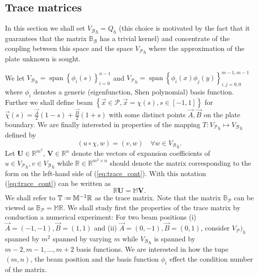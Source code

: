 \documentclass[a4paper,10pt]{article}
\newcommand{\R}{\ensuremath{\mathbb{R}}}
\newcommand{\inner}[2]{\ensuremath{\left(#1, #2\right)}}
\newcommand{\Vp}{\ensuremath{V_{\mathcal{P}}}}
\newcommand{\Vb}{\ensuremath{V_{\mathcal{B}}}}
\newcommand{\Bp}{\ensuremath{\mathbb{B}_{\mathcal{P}}}}
\newcommand{\Bb}{\ensuremath{\mathbb{B}_{\mathcal{B}}}}
\newcommand{\Mmat}{\ensuremath{\mathbb{M}}}
\newcommand*{\defeq}{\mathrel{\vcenter{\baselineskip0.5ex \lineskiplimit0pt
                     \hbox{\scriptsize.}\hbox{\scriptsize.}}}%
                     =}
\DeclareMathOperator{\spn}{span}
\begin{document}
\subsection{Trace matrices}
In this section we shall set ${\Vb}_h=Q_h$ (this choice is motivated by the 
fact that it guarantees that the matrix $\Bb$ has a trivial kernel) and 
concentrate of the coupling between this space and the space ${\Vp}_h$ where
the approximation of the plate unknown is sought.

We let ${\Vb}_h=\spn\left\{\phi_i(s)\right\}_{i=0}^{n-1}$ and
${\Vp}_h=\spn\left\{\phi_i(x) \phi_j(y)\right\}_{i, j=0, 0}^{m-1, m-1}$ where
$\phi_i$ denotes a generic (eigenfunction, Shen polynomial) basis function.
Further we shall define beam 
$\left\{\vec{x}\in\mathcal{P}, \vec{x}=\chi(s), s\in\left[-1, 1\right]\right\}$
for $\vec{\chi}(s)=\frac{\vec{A}}{2}(1-s) +\frac{\vec{B}}{2}(1+s)$ with some
distinct points $\vec{A}, \vec{B}$ on the plate boundary. We are finally
interested in properties of the mapping $T:{\Vp}_h\mapsto{\Vb}_h$ defined
by
\begin{equation}
  \label{eq:trace_cont}
\inner{u\circ\chi}{w} = \inner{v}{w}\quad\forall w\in{\Vb}_h.
\end{equation}
Let $\mathbf{U}\in\R^{m^2}$, $\mathbf{V}\in\R^{n}$ denote the vectors of expansion
coefficients of $u\in{\Vp}_h, v\in{\Vb}_h$ while $\mathbb{R}\in\R^{m^2\times n}$
should denote the matrix corresponding to the form on the left-hand side of
(\ref{eq:trace_cont}). With this notation (\ref{eq:trace_cont}) can be
written as
\[
  \mathbb{R}\mathbf{U} = \Mmat\mathbf{V}.
\]
We shall refer to $\mathbb{T}\defeq\Mmat^{-1}\mathbb{R}$ as the trace matrix.
Note that the matrix $\Bp$ can be viewed as $\Bp=\Mmat\mathbb{R}$. We shall
study first the properties of the trace matrix by conduction a numerical
experiment: For two beam positions (i) $\vec{A}=(-1, -1), \vec{B}=(1,
1)$ and (ii) $\vec{A}= (0, -1), \vec{B} = (0, 1)$, consider ${\Vp})_h$ spanned
by $m^2$ spanned by varying $m$ while ${\Vb}_h$ is spanned by $m-2, m-1, \dots,
m+2$ basis functions. We are interested in how the tupe $(m, n)$, the beam
position and the basis function $\phi_i$ effect the condition number of the
matrix.
\end{document}
